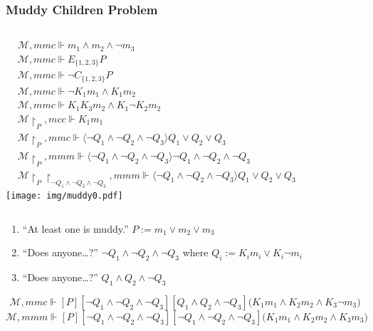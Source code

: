 \documentclass[UTF8,aspectratio=43,11pt,colorlinks,compress,openany]{beamer}%
\begin{document}
\begin{frame}\frametitle{Muddy Children Problem}\vspace*{-10pt}
\begin{columns}
\column{\textwidth}
\begin{align*}
&\mathcal{M},mmc\Vdash m_1\wedge m_2\wedge\neg m_3\\
&\mathcal{M},mmc\Vdash E_{\{1,2,3\}} P\\
&\mathcal{M},mmc\Vdash \neg C_{\{1,2,3\}} P\\
&\mathcal{M},mmc\Vdash \neg K_1m_1\wedge K_1m_2\\
&\mathcal{M},mmc\Vdash K_1K_3m_2\wedge K_1\neg K_2m_2\\
&\mathcal{M}{\restriction_P},mcc\Vdash K_1m_1\\
&\mathcal{M}{\restriction_P},mmc\Vdash\langle \neg Q_1\wedge\neg Q_2\wedge\neg Q_3\rangle Q_1\vee Q_2\vee Q_3\\
&\mathcal{M}{\restriction_P},mmm\Vdash\langle \neg Q_1\wedge\neg Q_2\wedge\neg Q_3\rangle \neg Q_1\wedge\neg Q_2\wedge\neg Q_3\\
&\mathcal{M}{\restriction_P}{\restriction_{\neg Q_1\wedge\neg Q_2\wedge\neg Q_3}},mmm\Vdash\langle \neg Q_1\wedge\neg Q_2\wedge\neg Q_3\rangle Q_1\vee Q_2\vee Q_3
\end{align*}
\vspace{.45\textwidth}\hspace*{-1.5\textwidth}
\texttt{[image: img/muddy0.pdf]}
\end{columns}
\begin{enumerate}
	\item ``At least one is muddy.'' $P:=m_1\vee m_2\vee m_3$
	\item ``Does anyone\dots?'' $\neg Q_1\wedge\neg Q_2\wedge\neg Q_3$ where $Q_i:=K_im_i\vee K_i\neg m_i$
	\item ``Does anyone\dots?'' $Q_1\wedge Q_2\wedge\neg Q_3$
\end{enumerate}
\[\mathcal{M},mmc\Vdash[P][\neg Q_1\wedge\neg Q_2\wedge\neg Q_3][Q_1\wedge Q_2\wedge\neg Q_3]\big(K_1m_1\wedge K_2m_2\wedge K_3\neg m_3\big)\]
\[\mathcal{M},mmm\Vdash[P][\neg Q_1\wedge\neg Q_2\wedge\neg Q_3][\neg Q_1\wedge\neg Q_2\wedge\neg Q_3]\big(K_1m_1\wedge K_2m_2\wedge K_3m_3\big)\]
\end{frame}
\end{document}
